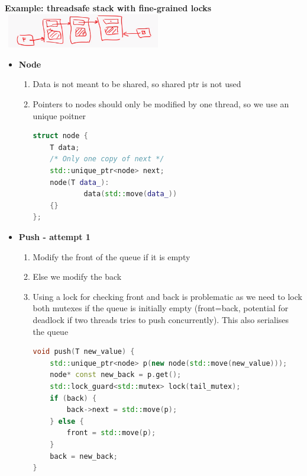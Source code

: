 \documentclass[10pt, landscape]{article}
\begin{document}
\begin{multicols}{4}
\textbf{Example: threadsafe stack with fine-grained locks} \\
\includegraphics*[width=7cm,height=1.5cm]{finegrained_queue.png}
\begin{itemize}
    \item \textbf{Node}
    \begin{enumerate}
        \item Data is not meant to be shared, so shared ptr is not used 
        \item Pointers to nodes should only be modified by one thread, so we use an unique poitner 
        \begin{lstlisting}[language=C++, breaklines=true, breakatwhitespace=true]
struct node {
    T data;
    /* Only one copy of next */
    std::unique_ptr<node> next;
    node(T data_):
            data(std::move(data_))
    {}
};
        \end{lstlisting}
    \end{enumerate}
    \item \textbf{Push - attempt 1} \\
    \begin{enumerate}
        \item Modify the front of the queue if it is empty
        \item Else we modify the back
        \item Using a lock for checking front and back is problematic as we need to lock both mutexes if the queue is initially empty (front=back, potential for deadlock if two threads tries to push concurrently). This also serialises the queue 
\begin{lstlisting}[language=C++, breaklines=true, breakatwhitespace=true]
void push(T new_value) {
    std::unique_ptr<node> p(new node(std::move(new_value)));
    node* const new_back = p.get();
    std::lock_guard<std::mutex> lock(tail_mutex);
    if (back) {
        back->next = std::move(p);
    } else {
        front = std::move(p);
    }
    back = new_back;
}
\end{lstlisting}
    \end{enumerate}


\end{itemize}
\end{multicols}
\end{document}
